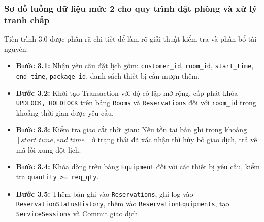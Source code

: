 \subsubsection{Sơ đồ luồng dữ liệu mức 2 cho quy trình đặt phòng và xử lý tranh chấp}
Tiến trình 3.0 được phân rã chi tiết để làm rõ giải thuật kiểm tra và phân bổ tài nguyên:
\begin{itemize}[leftmargin=2em]
    \item \textbf{Bước 3.1:} Nhận yêu cầu đặt lịch gồm: \texttt{customer\_id}, \texttt{room\_id}, \texttt{start\_time}, \texttt{end\_time}, \texttt{package\_id}, danh sách thiết bị cần mượn thêm.
    \item \textbf{Bước 3.2:} Khởi tạo Transaction với độ cô lập mở rộng, cấp phát khóa \texttt{UPDLOCK, HOLDLOCK} trên bảng \texttt{Rooms} và \texttt{Reservations} đối với \texttt{room\_id} trong khoảng thời gian được yêu cầu.
    \item \textbf{Bước 3.3:} Kiểm tra giao cắt thời gian: Nếu tồn tại bản ghi trong khoảng $[start\_time, end\_time]$ ở trạng thái đã xác nhận thì hủy bỏ giao dịch, trả về mã lỗi xung đột lịch.
    \item \textbf{Bước 3.4:} Khóa dòng trên bảng \texttt{Equipment} đối với các thiết bị yêu cầu, kiểm tra \texttt{quantity >= req\_qty}.
    \item \textbf{Bước 3.5:} Thêm bản ghi vào \texttt{Reservations}, ghi log vào \texttt{ReservationStatusHistory}, thêm vào \texttt{ReservationEquipments}, tạo \texttt{ServiceSessions} và Commit giao dịch.
\end{itemize}
